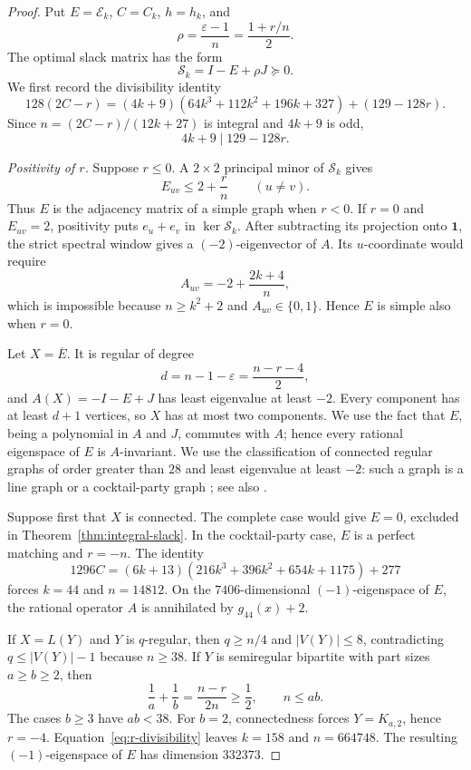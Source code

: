 \documentclass[a4paper,10pt,reqno]{amsart}
\theoremstyle{plain}
\theoremstyle{definition}
\theoremstyle{remark}
\newcommand{\one}{\mathbf 1}
\begin{document}
\begin{proof}
Put \(E=\mathcal E_k\), \(C=C_k\), \(h=h_k\), and
\[
 \rho=\frac{\varepsilon-1}{n}
      =\frac{1+r/n}{2}.
\]
The optimal slack matrix has the form
\[
 \mathcal S_k=I-E+\rho J\succeq0.
\]
 We first record the divisibility identity
\[
 128(2C-r)
 =(4k+9)(64k^3+112k^2+196k+327)+(129-128r).
\]
Since \(n=(2C-r)/(12k+27)\) is integral and \(4k+9\) is odd,
\begin{equation}\label{eq:r-divisibility}
 4k+9\mid129-128r.
\end{equation}

\smallskip
\noindent\emph{Positivity of \(r\).}
Suppose \(r\le0\).  A \(2\times2\) principal minor of \(\mathcal S_k\)
gives
\[
 E_{uv}\le2+\frac rn\qquad(u\ne v).
\]
Thus \(E\) is the adjacency matrix of a simple graph when \(r<0\).  If
\(r=0\) and \(E_{uv}=2\), positivity puts \(e_u+e_v\) in
\(\ker\mathcal S_k\).  After subtracting its projection onto \(\one\), the
strict spectral window gives a \((-2)\)-eigenvector of \(A\).  Its
\(u\)-coordinate would require
\[
 A_{uv}=-2+\frac{2k+4}{n},
\]
which is impossible because \(n\ge k^2+2\) and \(A_{uv}\in\{0,1\}\).
Hence \(E\) is simple also when \(r=0\).

Let \(X=\overline E\).  It is regular of degree
\[
 d=n-1-\varepsilon=\frac{n-r-4}{2},
\]
and \(A(X)=-I-E+J\) has least eigenvalue at least \(-2\).  Every component
has at least \(d+1\) vertices, so \(X\) has at most two components.  We use
the fact that \(E\), being a polynomial in \(A\) and \(J\), commutes with
\(A\); hence every rational eigenspace of \(E\) is \(A\)-invariant.  We use
 the classification of connected regular graphs of order greater than \(28\)
 and least eigenvalue at least \(-2\): such a graph is a line graph or a
 cocktail-party graph \cite[Theorem~4.1.1]{CvetkovicEtAl2004};
 see also \cite{KoolenEtAl2025}.

Suppose first that \(X\) is connected.  The complete case would give
\(E=0\), excluded in Theorem~\ref{thm:integral-slack}.  In the
cocktail-party case, \(E\) is a perfect matching and \(r=-n\).  The identity
\[
 1296C=(6k+13)(216k^3+396k^2+654k+1175)+277
\]
forces \(k=44\) and \(n=14812\).  On the \(7406\)-dimensional
 \((-1)\)-eigenspace of \(E\), the rational operator \(A\) is annihilated by
 \(g_{44}(x)+2\).

If \(X=L(Y)\) and \(Y\) is \(q\)-regular, then \(q\ge n/4\) and
\(|V(Y)|\le8\), contradicting \(q\le |V(Y)|-1\) because \(n\ge38\).
If \(Y\) is semiregular bipartite with part sizes \(a\ge b\ge2\), then
\[
 \frac1a+\frac1b=\frac{n-r}{2n}\ge\frac12,\qquad n\le ab.
\]
The cases \(b\ge3\) have \(ab<38\).  For \(b=2\), connectedness forces
\(Y=K_{a,2}\), hence \(r=-4\).  Equation~\eqref{eq:r-divisibility} leaves
\(k=158\) and \(n=664748\).  The resulting \((-1)\)-eigenspace of \(E\)
 has dimension \(332373\).


\end{proof}
\end{document}
